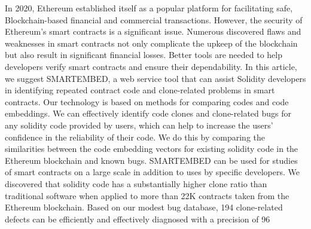 In 2020, Ethereum established itself as a popular platform for facilitating safe, Blockchain-based financial and commercial transactions.
However, the security of Ethereum's smart contracts is a significant issue.
Numerous discovered flaws and weaknesses in smart contracts not only complicate the upkeep of the blockchain but also result in significant financial losses. Better tools are needed to help developers verify smart contracts and ensure their dependability.
In this article, we suggest SMARTEMBED, a web service tool that can assist Solidity developers in identifying repeated contract code and clone-related problems in smart contracts.
Our technology is based on methods for comparing codes and code embeddings.
We can effectively identify code clones and clone-related bugs for any solidity code provided by users, which can help to increase the users' confidence in the reliability of their code. We do this by comparing the similarities between the code embedding vectors for existing solidity code in the Ethereum blockchain and known bugs.
SMARTEMBED can be used for studies of smart contracts on a large scale in addition to uses by specific developers.
We discovered that solidity code has a substantially higher clone ratio than traditional software when applied to more than 22K contracts taken from the Ethereum blockchain. Based on our modest bug database, 194 clone-related defects can be efficiently and effectively diagnosed with a precision of 96%


